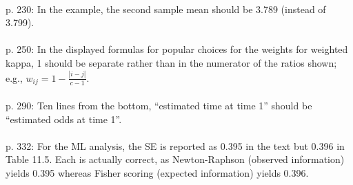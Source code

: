 \documentclass[12pt]{article}
\begin{document}
\ \\
p. 230: In the example, the second sample mean should be 3.789
(instead of 3.799). \\
\ \\
p. 250: In the displayed formulas for popular choices for the weights
for weighted kappa, 1 should be separate rather than in the numerator
of the ratios shown; e.g., $w_{ij} = 1 - \frac{|i-j|}{c-1}$. \\
\ \\
p. 290: Ten lines from the bottom, ``estimated time at time 1''
should be ``estimated odds at time 1''. \\
\ \\
p. 332: For the ML analysis, the SE is reported as 0.395 in the text
but 0.396 in Table 11.5.  Each is actually correct, as Newton-Raphson
(observed information) yields 0.395 whereas Fisher scoring (expected
information) yields 0.396. \\

\ \\
\end{document}
